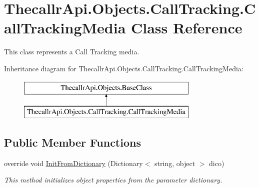 \hypertarget{class_thecallr_api_1_1_objects_1_1_call_tracking_1_1_call_tracking_media}{\section{Thecallr\+Api.\+Objects.\+Call\+Tracking.\+Call\+Tracking\+Media Class Reference}
\label{class_thecallr_api_1_1_objects_1_1_call_tracking_1_1_call_tracking_media}
}


This class represents a Call Tracking media.  


Inheritance diagram for Thecallr\+Api.\+Objects.\+Call\+Tracking.\+Call\+Tracking\+Media\+:\begin{figure}[H]
\begin{center}
\leavevmode
\includegraphics[height=2.000000cm]{class_thecallr_api_1_1_objects_1_1_call_tracking_1_1_call_tracking_media}
\end{center}
\end{figure}
\subsection*{Public Member Functions}
\begin{DoxyCompactItemize}
\item 
override void \hyperlink{class_thecallr_api_1_1_objects_1_1_call_tracking_1_1_call_tracking_media_af0c9f5035ded4624dbd9d6bc6f004fb3}{Init\+From\+Dictionary} (Dictionary$<$ string, object $>$ dico)
\begin{DoxyCompactList}\small\item\em This method initializes object properties from the parameter dictionary. \end{DoxyCompactList}\end{DoxyCompactItemize}
